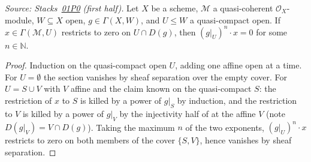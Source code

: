 \begin{lemma}
  \label{lem:qcqs_section_localization_torsion}
  \leanok
  \textit{Source: Stacks~\href{https://stacks.math.columbia.edu/tag/01P0}{01P0}
  (first half).}
  Let $X$ be a scheme, $\mathcal{M}$ a quasi-coherent $\mathcal{O}_X$-module,
  $W \subseteq X$ open, $g \in \Gamma(X, W)$, and $U \le W$ a quasi-compact
  open. If $x \in \Gamma(\mathcal{M}, U)$ restricts to zero on
  $U \cap D(g)$, then $(g|_U)^n \cdot x = 0$ for some $n \in \mathbb{N}$.
\end{lemma}
\begin{proof}
  \leanok
  Induction on the quasi-compact open $U$, adding one affine open at a time.
  For $U = \emptyset$ the section vanishes by sheaf separation over the empty
  cover. For $U = S \cup V$ with $V$ affine and the claim known on the
  quasi-compact $S$: the restriction of $x$ to $S$ is killed by a power of
  $g|_S$ by induction, and the restriction to $V$ is killed by a power of
  $g|_V$ by the injectivity half of
   at the affine $V$ (note
  $D(g|_V) = V \cap D(g)$). Taking the maximum $n$ of the two exponents,
  $(g|_U)^n \cdot x$ restricts to zero on both members of the cover
  $\{S, V\}$, hence vanishes by sheaf separation.
\end{proof}

